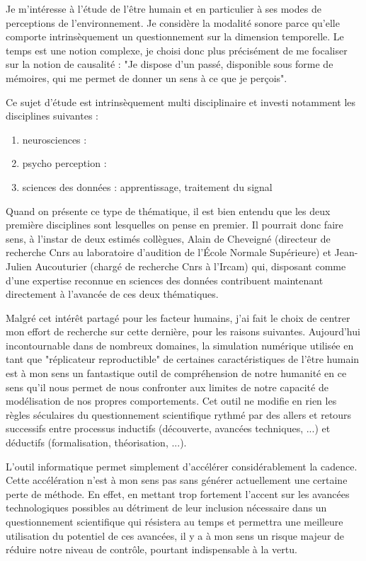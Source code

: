Je m'intéresse à l'étude de l'être humain et en particulier à ses modes de perceptions de l'environnement. Je considère la modalité sonore parce qu'elle comporte intrinsèquement un questionnement sur la dimension temporelle. Le temps est une notion complexe, je choisi donc plus précisément de me focaliser sur la notion de causalité : "Je dispose d'un passé, disponible sous forme de mémoires, qui me permet de donner un sens à ce que je perçois".

Ce sujet d'étude est intrinsèquement multi disciplinaire et investi notamment les disciplines suivantes :
\begin{enumerate}
  \item neurosciences :
  \item psycho perception :
  \item sciences des données : apprentissage, traitement du signal
\end{enumerate}

Quand on présente  ce type de thématique, il est bien entendu que les deux première disciplines sont lesquelles on pense en premier. Il pourrait donc faire sens, à l'instar de deux estimés collègues, Alain de Cheveigné (directeur de recherche Cnrs au laboratoire d'audition de l'\'Ecole Normale Supérieure) et Jean-Julien Aucouturier (chargé de recherche Cnrs à l'Ircam) qui, disposant comme d'une expertise reconnue en sciences des données contribuent maintenant directement à l'avancée de ces deux thématiques.

Malgré cet intérêt partagé pour les facteur humains, j'ai fait le choix de centrer mon effort de recherche sur cette dernière, pour les raisons suivantes. Aujourd'hui incontournable dans de nombreux domaines, la simulation numérique utilisée en tant que "réplicateur reproductible" de certaines caractéristiques de l'être humain est à mon sens un fantastique outil de compréhension de notre humanité en ce sens qu'il nous permet de nous confronter aux limites de notre capacité de modélisation de nos propres comportements. Cet outil ne modifie en rien les règles séculaires du questionnement scientifique rythmé par des allers et retours successifs entre processus inductifs (découverte, avancées techniques, ...) et déductifs (formalisation, théorisation, ...).

L'outil informatique permet simplement d'accélérer considérablement la cadence. Cette accélération n'est à mon sens pas sans générer actuellement une certaine perte de méthode. En effet, en mettant trop fortement l'accent sur les avancées technologiques possibles au détriment de leur inclusion nécessaire dans un questionnement scientifique qui résistera au temps et permettra une meilleure utilisation du potentiel de ces avancées, il y a à mon sens un risque majeur de réduire notre niveau de contrôle, pourtant indispensable à la vertu.

